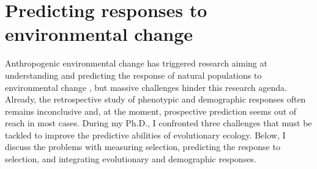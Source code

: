 \section{Predicting responses to environmental change}
Anthropogenic environmental change has triggered research aiming at understanding and predicting the response of natural populations to environmental change \parencite{parmesan2006, Chevin2012, Smallegange2013, Charmantier2014climate}, but massive challenges hinder this research agenda. Already, the retrospective study of phenotypic and demographic responses often remains inconclusive \parencite{Merila2001,McCarty2001, Charmantier2014climate, Brookfield2016} and, at the moment, prospective prediction seems out of reach in most cases. 
During my Ph.D., I confronted three challenges that must be tackled to improve the predictive abilities of evolutionary ecology. Below, I discuss the problems with measuring selection, predicting the response to selection, and integrating evolutionary and demographic responses.

